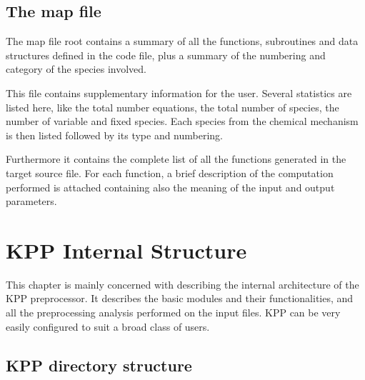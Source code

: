 \documentclass[twoside]{article}
\newcommand{\kpproot}{{\sc root}}
\begin{document}
\subsection{The map file}
\label{sec:output-map}

The map file \kpproot{} contains a summary of all the
functions, subroutines and data structures defined in the code file,
plus a summary of the numbering and category of the species involved.

This file contains supplementary information for the user. Several
statistics are listed here, like the total number equations, the total
number of species, the number of variable and fixed species. Each
species from the chemical mechanism is then listed followed by its type
and numbering.

Furthermore it contains the complete list of all the functions generated
in the target source file. For each function, a brief description of the
computation performed is attached containing also the meaning of the
input and output parameters.

\section{KPP Internal Structure}
\label{sec:internal-structure}

This chapter is mainly concerned with describing the internal
architecture of the KPP preprocessor. It describes the basic modules and
their functionalities, and all the preprocessing analysis performed on
the input files. KPP can be very easily configured to suit a broad class
of users.

\subsection{KPP directory structure}
\label{sec:directory-structure}
\end{document}
